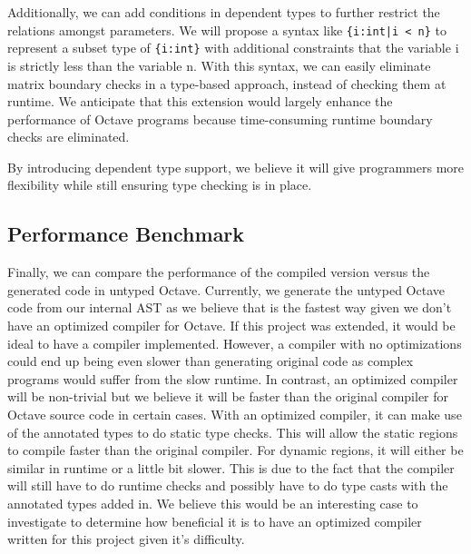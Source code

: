 Additionally, we can add conditions in dependent types to further restrict the relations amongst parameters. We will propose a syntax like {\tt \{i:int|i < n\}} to represent a subset type of {\tt \{i:int\}} with additional constraints that the variable i is strictly less than the variable n. With this syntax, we can easily eliminate matrix boundary checks in a type-based approach, instead of checking them at runtime. We anticipate that this extension would largely enhance the performance of Octave programs because time-consuming runtime boundary checks are eliminated.

By introducing dependent type support, we believe it will give programmers more flexibility while still ensuring type checking is in place. 

\subsection{Performance Benchmark}
Finally, we can compare the performance of the compiled version versus the generated code in untyped Octave. Currently, we generate the untyped Octave code from our internal AST as we believe that is the fastest way given we don't have an optimized compiler for Octave. If this project was extended, it would be ideal to have a compiler implemented. However, a compiler with no optimizations could end up being even slower than generating original code as complex programs would suffer from the slow runtime. In contrast, an optimized compiler will be non-trivial but we believe it will be faster than the original compiler for Octave source code in certain cases. With an optimized compiler, it can make use of the annotated types to do static type checks. This will allow the static regions to compile faster than the original compiler. For dynamic regions, it will either be similar in runtime or a little bit slower. This is due to the fact that the compiler will still have to do runtime checks and possibly have to do type casts with the annotated types added in. We believe this would be an interesting case to investigate to determine how beneficial it is to have an optimized compiler written for this project given it's difficulty. 

